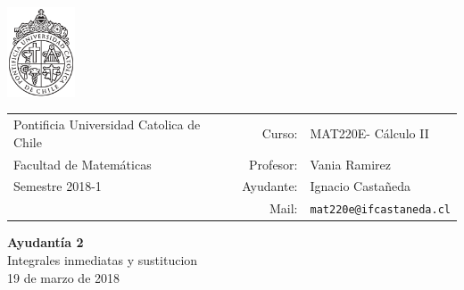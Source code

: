 \documentclass[12pt]{article}
\makeatletter
\newcommand{\ayudantia}{{\sc Ayudantía 2}}
\newcommand{\tituloayu}{Integrales inmediatas y sustitucion}
\newcommand{\fecha}{19 de marzo de 2018}
\newcommand{\sigla}{MAT220E}
\newcommand{\nombre}{Cálculo II}
\newcommand{\profesor}{Vania Ramirez}
\newcommand{\ano}{2018}
\newcommand{\semestre}{1}
\newcommand{\mail}{mat220e@ifcastaneda.cl}
\makeatother
\begin{document}
\thispagestyle{empty}

\begin{minipage}{2cm}
	\includegraphics[width=2cm]{../../../../img/logo.pdf}
	\vspace{0.5cm}
\end{minipage}
\begin{minipage}{\linewidth}
	\begin{tabular}{lrl}
		{\scriptsize\sc Pontificia Universidad Catolica de Chile} & \hspace*{0.7in}Curso: &
		\sigla  - \nombre\\
		{\sc Facultad de Matemáticas}&
		Profesor: & \profesor \\
		{\sc Semestre \ano-\semestre} & Ayudante: & {Ignacio Castañeda}\\
		& {Mail:} & \texttt{\mail}
	\end{tabular}
\end{minipage}

\vspace{-10mm}
\begin{center}
	{\LARGE\bf \ayudantia}\\
	\vspace{0.1cm}
	{\tituloayu}\\
	\vspace{0.1cm}
	\fecha\\
	\vspace{0.4cm}
\end{center}
\end{document}
